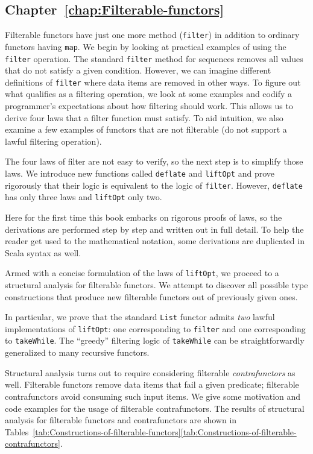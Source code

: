 \subsection{Chapter~\ref{chap:Filterable-functors}}

Filterable functors have just one more method (\lstinline!filter!)
in addition to ordinary functors having \lstinline!map!. We begin
by looking at practical examples of using the \lstinline!filter!
operation. The standard \lstinline!filter! method for sequences removes
all values that do not satisfy a given condition. However, we can
imagine different definitions of \lstinline!filter! where data items
are removed in other ways. To figure out what qualifies as a filtering
operation, we look at some examples and codify a programmer\textsf{'}s expectations
about how filtering should work. This allows us to derive four laws
that a filter function must satisfy. To aid intuition, we also examine
a few examples of functors that are not filterable (do not support
a lawful filtering operation).

The four laws of filter are not easy to verify, so the next step is
to simplify those laws. We introduce new functions called \lstinline!deflate!
and \lstinline!liftOpt! and prove rigorously that their logic is
equivalent to the logic of \lstinline!filter!. However, \lstinline!deflate!
has only three laws and \lstinline!liftOpt! only two. 

Here for the first time this book embarks on rigorous proofs of laws,
so the derivations are performed step by step and written out in full
detail. To help the reader get used to the mathematical notation,
some derivations are duplicated in Scala syntax as well.

Armed with a concise formulation of the laws of \lstinline!liftOpt!,
we proceed to a structural analysis for filterable functors. We attempt
to discover all possible type constructions that produce new filterable
functors out of previously given ones.

In particular, we prove that the standard \lstinline!List! functor
admits \emph{two} lawful implementations of \lstinline!liftOpt!:
one corresponding to \lstinline!filter! and one corresponding to
\lstinline!takeWhile!. The \textsf{``}greedy\textsf{''} filtering logic of \lstinline!takeWhile!
can be straightforwardly generalized to many recursive functors.

Structural analysis turns out to require considering filterable \emph{contrafunctors}
as well. Filterable functors remove data items that fail a given predicate;
filterable contrafunctors avoid consuming such input items. We give
some motivation and code examples for the usage of filterable contrafunctors.
The results of structural analysis for filterable functors and contrafunctors
are shown in Tables~\ref{tab:Constructions-of-filterable-functors}\textendash \ref{tab:Constructions-of-filterable-contrafunctors}.


